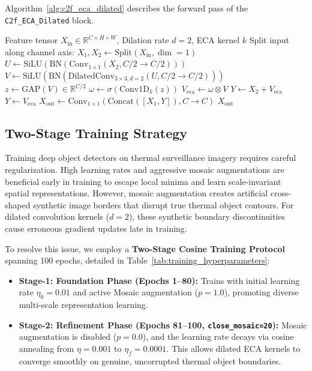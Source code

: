 \documentclass[journal,twoside,web]{ieeecolor}
\begin{document}
Algorithm~\ref{alg:c2f_eca_dilated} describes the forward pass of the \texttt{C2f\_ECA\_Dilated} block.

\begin{algorithm}[t]
\caption{Forward Execution of \texttt{C2f\_ECA\_Dilated} Bottleneck}
\label{alg:c2f_eca_dilated}
\begin{algorithmic}[1]
\REQUIRE Feature tensor $X_{\text{in}} \in \mathbb{R}^{C \times H \times W}$, Dilation rate $d=2$, ECA kernel $k$
\STATE Split input along channel axis: $X_1, X_2 \leftarrow \mathrm{Split}(X_{\text{in}}, \dim=1)$
\STATE $U \leftarrow \mathrm{SiLU}\left(\mathrm{BN}\left(\mathrm{Conv}_{1\times1}(X_2, C/2 \rightarrow C/2)\right)\right)$
\STATE $V \leftarrow \mathrm{SiLU}\left(\mathrm{BN}\left(\mathrm{DilatedConv}_{3\times3, d=2}(U, C/2 \rightarrow C/2)\right)\right)$
\STATE $z \leftarrow \mathrm{GAP}(V) \in \mathbb{R}^{C/2}$
\STATE $\omega \leftarrow \sigma\left(\mathrm{Conv1D}_k(z)\right)$
\STATE $V_{\text{eca}} \leftarrow \omega \otimes V$
    \STATE $Y \leftarrow X_2 + V_{\text{eca}}$
\ELSE
    \STATE $Y \leftarrow V_{\text{eca}}$
\ENDIF
\STATE $X_{\text{out}} \leftarrow \mathrm{Conv}_{1\times1}(\mathrm{Concat}([X_1, Y]), C \rightarrow C)$
\RETURN $X_{\text{out}}$
\end{algorithmic}
\end{algorithm}

\subsection{Two-Stage Training Strategy}
Training deep object detectors on thermal surveillance imagery requires careful regularization. High learning rates and aggressive mosaic augmentations are beneficial early in training to escape local minima and learn scale-invariant spatial representations. However, mosaic augmentation creates artificial cross-shaped synthetic image borders that disrupt true thermal object contours. For dilated convolution kernels ($d=2$), these synthetic boundary discontinuities cause erroneous gradient updates late in training.

To resolve this issue, we employ a \textbf{Two-Stage Cosine Training Protocol} spanning 100 epochs, detailed in Table~\ref{tab:training_hyperparameters}:
\begin{itemize}
    \item \textbf{Stage-1: Foundation Phase (Epochs 1--80):} Trains with initial learning rate $\eta_0=0.01$ and active Mosaic augmentation ($p=1.0$), promoting diverse multi-scale representation learning.
    \item \textbf{Stage-2: Refinement Phase (Epochs 81--100, \texttt{close\_mosaic=20}):} Mosaic augmentation is disabled ($p=0.0$), and the learning rate decays via cosine annealing from $\eta=0.001$ to $\eta_f=0.0001$. This allows dilated ECA kernels to converge smoothly on genuine, uncorrupted thermal object boundaries.
\end{itemize}
\end{document}
